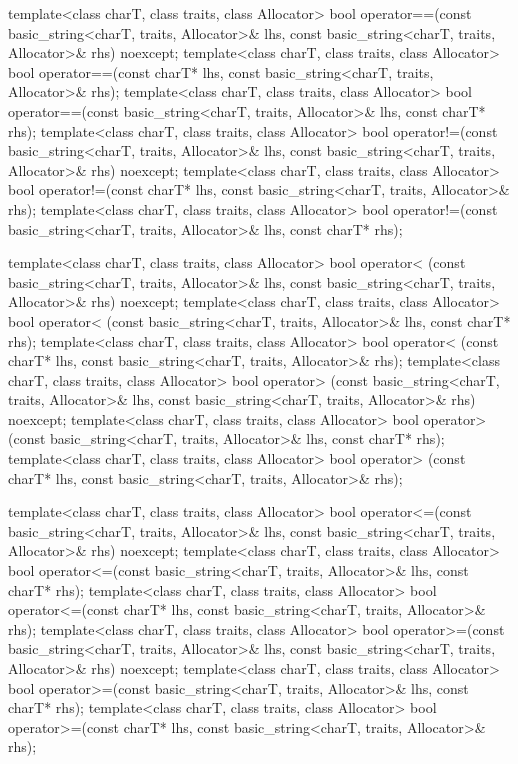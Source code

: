 \begin{codeblock}
{  template<class charT, class traits, class Allocator>
    bool operator==(const basic_string<charT, traits, Allocator>& lhs,
                    const basic_string<charT, traits, Allocator>& rhs) noexcept;
  template<class charT, class traits, class Allocator>
    bool operator==(const charT* lhs,
                    const basic_string<charT, traits, Allocator>& rhs);
  template<class charT, class traits, class Allocator>
    bool operator==(const basic_string<charT, traits, Allocator>& lhs,
                    const charT* rhs);
  template<class charT, class traits, class Allocator>
    bool operator!=(const basic_string<charT, traits, Allocator>& lhs,
                    const basic_string<charT, traits, Allocator>& rhs) noexcept;
  template<class charT, class traits, class Allocator>
    bool operator!=(const charT* lhs,
                    const basic_string<charT, traits, Allocator>& rhs);
  template<class charT, class traits, class Allocator>
    bool operator!=(const basic_string<charT, traits, Allocator>& lhs,
                    const charT* rhs);

  template<class charT, class traits, class Allocator>
    bool operator< (const basic_string<charT, traits, Allocator>& lhs,
                    const basic_string<charT, traits, Allocator>& rhs) noexcept;
  template<class charT, class traits, class Allocator>
    bool operator< (const basic_string<charT, traits, Allocator>& lhs,
                    const charT* rhs);
  template<class charT, class traits, class Allocator>
    bool operator< (const charT* lhs,
                    const basic_string<charT, traits, Allocator>& rhs);
  template<class charT, class traits, class Allocator>
    bool operator> (const basic_string<charT, traits, Allocator>& lhs,
                    const basic_string<charT, traits, Allocator>& rhs) noexcept;
  template<class charT, class traits, class Allocator>
    bool operator> (const basic_string<charT, traits, Allocator>& lhs,
                    const charT* rhs);
  template<class charT, class traits, class Allocator>
    bool operator> (const charT* lhs,
                    const basic_string<charT, traits, Allocator>& rhs);

  template<class charT, class traits, class Allocator>
    bool operator<=(const basic_string<charT, traits, Allocator>& lhs,
                    const basic_string<charT, traits, Allocator>& rhs) noexcept;
  template<class charT, class traits, class Allocator>
    bool operator<=(const basic_string<charT, traits, Allocator>& lhs,
                    const charT* rhs);
  template<class charT, class traits, class Allocator>
    bool operator<=(const charT* lhs,
                    const basic_string<charT, traits, Allocator>& rhs);
  template<class charT, class traits, class Allocator>
    bool operator>=(const basic_string<charT, traits, Allocator>& lhs,
                    const basic_string<charT, traits, Allocator>& rhs) noexcept;
  template<class charT, class traits, class Allocator>
    bool operator>=(const basic_string<charT, traits, Allocator>& lhs,
                    const charT* rhs);
  template<class charT, class traits, class Allocator>
    bool operator>=(const charT* lhs,
                    const basic_string<charT, traits, Allocator>& rhs);

}
\end{codeblock}

